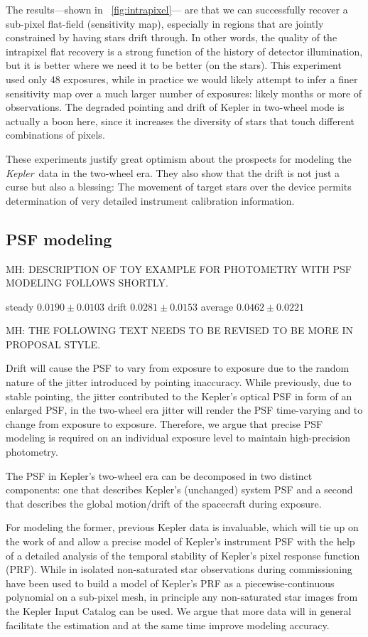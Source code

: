 \documentclass[letterpaper,12pt,whitepaper]{haastex}
\newcommand{\observatory}[1]{\textsl{#1}}
\newcommand{\Kepler}{\observatory{Kepler}}
\begin{document}
The results---shown in \figurename~\ref{fig:intrapixel}---%
  are that we can successfully recover a sub-pixel flat-field (sensitivity map),
  especially in regions that are jointly constrained by having stars drift through.
In other words, the quality of the intrapixel flat recovery is a strong function of the history
  of detector illumination, but it is better where we need it to be better (on the stars).
This experiment used only 48 exposures,
  while in practice we would likely attempt to infer a finer sensitivity map
  over a much larger number of exposures: likely months or more of observations.
The degraded pointing and drift of Kepler in two-wheel mode is actually a boon here,
  since it increases the diversity of stars that touch different combinations of pixels.

These experiments justify great optimism about the prospects for modeling the \Kepler\ data in the two-wheel era.
They also show that the drift is not just a curse but also a blessing:
The movement of target stars over the device
  permits determination of very detailed instrument calibration information.

\subsection{PSF modeling}\label{sec:psf}

MH: DESCRIPTION OF TOY EXAMPLE FOR PHOTOMETRY WITH PSF MODELING FOLLOWS SHORTLY.

steady    $0.0190 \pm 0.0103$
drift     $0.0281 \pm 0.0153$
average   $0.0462 \pm 0.0221$

MH: THE FOLLOWING TEXT NEEDS TO BE REVISED TO BE MORE IN PROPOSAL STYLE.

Drift will cause the PSF to vary from exposure to exposure due to the
random nature of the jitter introduced by pointing inaccuracy. While
previously, due to stable pointing, the jitter contributed to the
Kepler's optical PSF in form of an enlarged PSF, in the two-wheel era
jitter will render the PSF time-varying and to change from exposure to
exposure. Therefore, we argue that precise PSF modeling is required on
an individual exposure level to maintain high-precision photometry.

The PSF in Kepler's two-wheel era can be decomposed in two distinct
components: one that describes Kepler's (unchanged) system PSF and a
second that describes the global motion/drift of the spacecraft during
exposure.

For modeling the former, previous Kepler data is invaluable, which
will tie up on the work of \cite{bryson2010} and allow a precise model
of Kepler's instrument PSF with the help of a detailed analysis of the
temporal stability of Kepler's pixel response function (PRF). While in
\cite{bryson2010} isolated non-saturated star observations during
commissioning have been used to build a model of Kepler's PRF as a
piecewise-continuous polynomial on a sub-pixel mesh, in principle any
non-saturated star images from the Kepler Input Catalog can be
used. We argue that more data will in general facilitate the
estimation and at the same time improve modeling accuracy.
\end{document}
